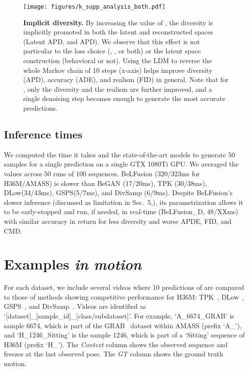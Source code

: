 \documentclass[10pt,twocolumn,letterpaper]{article}
\begin{document}
\begin{figure*}
    \centering
    \texttt{[image: figures/k\_supp\_analysis\_both.pdf]}
    \caption{\textbf{Implicit diversity. }By increasing the value of , the diversity is implicitly promoted in both the latent and reconstructed spaces (Latent APD, and APD). 
    We observe that this effect is not particular to the loss choice (, , or both) or the latent space construction (behavioral or not). Using the LDM to reverse the whole Markov chain of 10 steps (x-axis) helps improve diversity (APD), accuracy (ADE), and realism (FID) in general. Note that for , only the diversity and the realism are further improved, and a single denoising step becomes enough to generate the most accurate predictions.}
    \label{fig:supp_ext_k_analysis}
\end{figure*}



\subsection{Inference times}
\label{subsec:supp_implementation_times}

We computed the time it takes \modelname{} and the state-of-the-art models to generate 50 samples for a single prediction on a single GTX 1080Ti GPU. We averaged the values across 50 runs of 100 sequences.
BeLFusion (320/323ms for H36M/AMASS) is slower than BeGAN (17/20ms), TPK (30/38ms), DLow(34/43ms), GSPS(5/7ms), and DivSamp (6/9ms).
Despite BeLFusion's slower inference (discussed as limitation in Sec.~5,), its  parametrization allows it to be early-stopped and run, if needed, in real-time (BeLFusion\_D, 48/XXms) with similar accuracy in return for less diversity and worse APDE, FID, and CMD.

 \section{Examples \textit{in motion}}
\label{sec:supp_visual_examples}

For each dataset, we include several videos where 10 predictions of \modelname{} are compared to those of methods showing competitive performance for H36M: TPK~\cite{walker2017theposeknows}, DLow~\cite{yuan2020dlow}, GSPS~\cite{mao2021gsps}, and DivSamp~\cite{dang2022diverse}. Videos are identified as `[dataset]\_[sample\_id]\_[class/subdataset]'. For example, `A\_6674\_GRAB' is sample 6674, which is part of the GRAB~\cite{taheri2020grab} dataset within AMASS (prefix `A\_'), and `H\_1246\_Sitting' is the sample 1246, which is part of a `Sitting' sequence of H36M (prefix `H\_'). The \textit{Context} column shows the observed sequence and freezes at the last observed pose. The \textit{GT} column shows the ground truth motion. 
\end{document}
